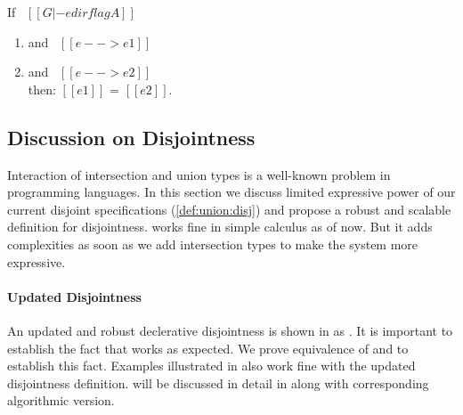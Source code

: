 \begin{lemma}[Determinism]
\label{lemma:union:determinism}
  If \ $[[G |- e dirflag A]]$
  \begin{enumerate}
  \item and \ $[[e --> e1]]$
  \item and \ $[[e --> e2]]$ \\
  then: $[[e1]]$ = $[[e2]]$.
  \end{enumerate}
\end{lemma}

\begin{comment}
\begin{proof}
  By induction on first reduction relation and inverting second reduction relation subsequently.
  All cases are trivial to solve by simple inversions except:
  \begin{itemize}
    \item Case \rref{typ-typeof} requires \cref{lemma:union:check-both-disj-false}.
  \end{itemize}
\end{proof}

\begin{lemma}[check-both-disj-false]
\label{lemma:union:check-both-disj-false}
If \ $[[A *s B]]$ \ and \ $[[G |- p <= A]]$ \ and \ $[[G |- p <= B]]$ \ then \ False.
\end{lemma}
\end{comment}



\subsection{Discussion on Disjointness}
\label{sec:union:discussion}
Interaction of intersection and union types is a well-known problem in programming languages.
In this section we discuss limited expressive power of our current disjoint specifications 
(\cref{def:union:disj}) and propose a robust and scalable definition for disjointness.
 works fine in simple calculus as of now. But it adds complexities as soon as we add
intersection types to make the system more expressive.

\paragraph{Updated Disjointness}
An updated and robust declerative disjointness is shown in  as .
It is important to establish the fact that  works as expected.
We prove equivalence of  and  to establish this fact.
Examples illustrated in  also work fine with the updated disjointness definition.
 will be discussed in detail in  along with corresponding
algorithmic version.

